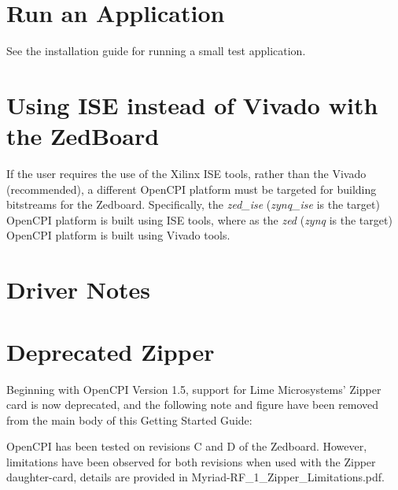 \section{Run an Application}
See the installation guide for running a small test application.
\pagebreak
\begin{appendices}

\section{Using ISE instead of Vivado with the ZedBoard}
\begin{flushleft}
If the user requires the use of the Xilinx ISE tools, rather than the Vivado (recommended), a different OpenCPI platform must be targeted for building bitstreams for the Zedboard. Specifically, the \textit{zed\_ise} (\textit{zynq\_ise} is the target) OpenCPI platform is built using ISE tools, where as the \textit{zed} (\textit{zynq} is the target) OpenCPI platform  is built using Vivado tools.\medskip
\end{flushleft}

\section{Driver Notes}

%
\section{Deprecated Zipper}
\begin{flushleft}
Beginning with OpenCPI Version 1.5, support for Lime Microsystems' Zipper card is now deprecated, and the following note and figure have been removed from the main body of this Getting Started Guide:\medskip

OpenCPI has been tested on revisions C and D of the Zedboard. However, limitations have been observed for both revisions when used with the Zipper daughter-card, details are provided in Myriad-RF\_1\_Zipper\_Limitations.pdf.
\end{flushleft}


\end{appendices}
